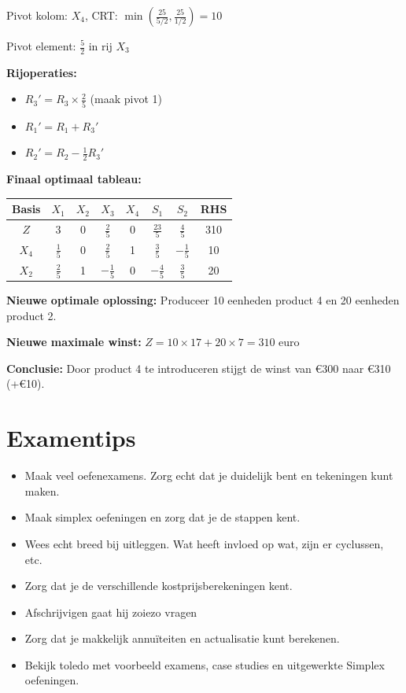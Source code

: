 \documentclass[a4paper,11pt]{article}
\begin{document}
\begin{oefenblok}[title=Productie Optimalisatie bij een Bedrijf]
Pivot kolom: $X_4$, CRT: $\min\left(\frac{25}{5/2}, \frac{25}{1/2}\right) = 10$

Pivot element: $\frac{5}{2}$ in rij $X_3$

\textbf{Rijoperaties:}
\begin{itemize}
    \item $R_3' = R_3 \times \frac{2}{5}$ (maak pivot 1)
    \item $R_1' = R_1 + R_3'$
    \item $R_2' = R_2 - \frac{1}{2}R_3'$
\end{itemize}

\textbf{Finaal optimaal tableau:}

\begin{center}
\begin{tabular}{c|cccccc|c}
\hline
Basis & $X_1$ & $X_2$ & $X_3$ & $X_4$ & $S_1$ & $S_2$ & RHS \\
\hline
$Z$ & 3 & 0 & $\frac{2}{5}$ & 0 & $\frac{23}{5}$ & $\frac{4}{5}$ & 310 \\
$X_4$ & $\frac{1}{5}$ & 0 & $\frac{2}{5}$ & 1 & $\frac{3}{5}$ & $-\frac{1}{5}$ & 10 \\
$X_2$ & $\frac{2}{5}$ & 1 & $-\frac{1}{5}$ & 0 & $-\frac{4}{5}$ & $\frac{3}{5}$ & 20 \\
\hline
\end{tabular}
\end{center}

\textbf{Nieuwe optimale oplossing:} Produceer 10 eenheden product 4 en 20 eenheden product 2.

\textbf{Nieuwe maximale winst:} $Z = 10 \times 17 + 20 \times 7 = 310$ euro

\textbf{Conclusie:} Door product 4 te introduceren stijgt de winst van €300 naar €310 (+€10).

\end{oefenblok}

\section{Examentips}

\begin{warningbox}[title=Examentips]
    \begin{itemize}
        \item Maak veel oefenexamens. Zorg echt dat je duidelijk bent en tekeningen kunt maken. 
        \item Maak simplex oefeningen en zorg dat je de stappen kent.
        \item Wees echt breed bij uitleggen. Wat heeft invloed op wat, zijn er cyclussen, etc.
        \item Zorg dat je de verschillende kostprijsberekeningen kent.
        \item Afschrijvigen gaat hij zoiezo vragen
        \item Zorg dat je makkelijk annuïteiten en actualisatie kunt berekenen.
        \item Bekijk toledo met voorbeeld examens, case studies en uitgewerkte Simplex oefeningen.
    \end{itemize}
\end{warningbox}
\end{document}
